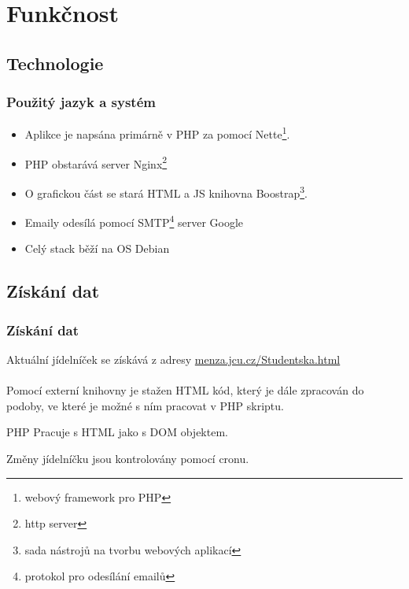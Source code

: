 \documentclass[slidestop]{beamer}
\begin{document}
\section{Funkčnost}
\subsection{Technologie}
\begin{frame}
\frametitle{Použitý jazyk a systém}
\vfill
\begin{itemize}

\item Aplikce je napsána primárně v PHP za pomocí Nette\footnote{webový framework pro PHP}.

\item PHP obstarává server Nginx\footnote{http server}

\item O grafickou část se stará HTML a JS knihovna Boostrap\footnote{sada nástrojů na tvorbu webových aplikací}.

\item Emaily odesílá pomocí SMTP\footnote{protokol pro odesílání emailů} server Google

\item Celý stack běží na OS Debian

\end{itemize}
\vfill
\end{frame}
\subsection{Získání dat}
\begin{frame}
\frametitle{Získání dat}
\vfill
Aktuální jídelníček se získává z adresy \href{http://menza.jcu.cz/Studentska.html}{menza.jcu.cz/Studentska.html}
\\~\\
Pomocí externí knihovny je stažen HTML kód, který je dále zpracován do podoby, ve které je možné s ním pracovat v PHP skriptu.

\begin{alertblock}{PHP}
Pracuje s HTML jako s DOM objektem.
\end{alertblock}

Změny jídelníčku jsou kontrolovány pomocí cronu.
\vfill
\end{frame}
\end{document}
